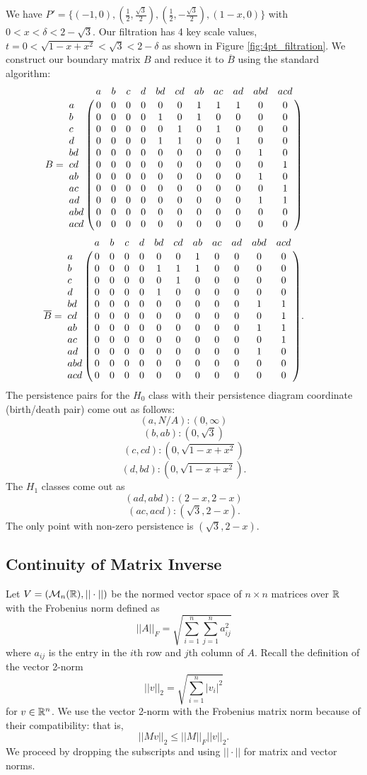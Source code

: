 \documentclass[letterpaper,titlepage]{article}
\begin{document}
We have $P' = \{(-1,0),(\frac{1}{2},\frac{\sqrt{3}}{2}),(\frac{1}{2},-\frac{\sqrt{3}}{2}),(1-x,0)\}$ with $0< x < \delta < 2-\sqrt{3}$.
Our filtration has 4 key scale values, $t = 0<\sqrt{1-x+x^2}< \sqrt{3}< 2-\delta$ as shown in Figure \ref{fig:4pt_filtration}. We construct our boundary matrix $B$ and reduce it to $\overline{B}$ using the standard algorithm:
$$B=\bordermatrix{ 
    &   a & b & c & d & bd & cd & ab & ac & ad & abd & acd\cr
    a & 0 & 0 & 0 & 0 &  0 &  0 &  1 &  1 &  1 &   0 &   0 \cr
    b & 0 & 0 & 0 & 0 &  1 &  0 &  1 &  0 &  0 &   0 &   0\cr
    c & 0 & 0 & 0 & 0 &  0 &  1 &  0 &  1 &  0 &   0 &   0\cr
    d & 0 & 0 & 0 & 0 &  1 &  1 &  0 &  0 &  1 &   0 &   0\cr
   bd & 0 & 0 & 0 & 0 &  0 &  0 &  0 &  0 &  0 &   1 &   0\cr
   cd & 0 & 0 & 0 & 0 &  0 &  0 &  0 &  0 &  0 &   0 &   1\cr
   ab & 0 & 0 & 0 & 0 &  0 &  0 &  0 &  0 &  0 &   1 &   0\cr
   ac & 0 & 0 & 0 & 0 &  0 &  0 &  0 &  0 &  0 &   0 &   1\cr
   ad & 0 & 0 & 0 & 0 &  0 &  0 &  0 &  0 &  0 &   1 &   1\cr
  abd & 0 & 0 & 0 & 0 &  0 &  0 &  0 &  0 &  0 &   0 &   0\cr
  acd & 0 & 0 & 0 & 0 &  0 &  0 &  0 &  0 &  0 &   0 &   0\cr
    } \qquad$$
$$\overline{B}=\bordermatrix{ 
    &   a & b & c & d & bd & cd & ab & ac & ad & abd & acd\cr
    a & 0 & 0 & 0 & 0 &  0 &  0 &  1 &  0 &  0 &   0 &   0 \cr
    b & 0 & 0 & 0 & 0 &  1 &  1 &  1 &  0 &  0 &   0 &   0\cr
    c & 0 & 0 & 0 & 0 &  0 &  1 &  0 &  0 &  0 &   0 &   0\cr
    d & 0 & 0 & 0 & 0 &  1 &  0 &  0 &  0 &  0 &   0 &   0\cr
   bd & 0 & 0 & 0 & 0 &  0 &  0 &  0 &  0 &  0 &   1 &   1\cr
   cd & 0 & 0 & 0 & 0 &  0 &  0 &  0 &  0 &  0 &   0 &   1\cr
   ab & 0 & 0 & 0 & 0 &  0 &  0 &  0 &  0 &  0 &   1 &   1\cr
   ac & 0 & 0 & 0 & 0 &  0 &  0 &  0 &  0 &  0 &   0 &   1\cr
   ad & 0 & 0 & 0 & 0 &  0 &  0 &  0 &  0 &  0 &   1 &   0\cr
  abd & 0 & 0 & 0 & 0 &  0 &  0 &  0 &  0 &  0 &   0 &   0\cr
  acd & 0 & 0 & 0 & 0 &  0 &  0 &  0 &  0 &  0 &   0 &   0\cr
    }. \qquad$$
The persistence pairs for the $H_0$ class with their persistence diagram coordinate (birth/death pair) come out as follows:
$$(a,N/A): (0,\infty)$$
$$(b,ab): (0,\sqrt{3})$$
$$(c, cd): (0,\sqrt{1-x+x^2})$$
$$(d, bd): (0,\sqrt{1-x+x^2}).$$
The $H_1$ classes come out as
$$(ad, abd): (2-x, 2-x)$$
$$(ac, acd): (\sqrt{3}, 2-x).$$
The only point with non-zero persistence is $(\sqrt{3}, 2-x).$


\subsection{Continuity of Matrix Inverse} \label{continuity_of_inverse} %
Let $V=(\mathcal{M}_n(\mathbb{R}), ||\cdot||)$ be the normed vector space of $n\times n$ matrices over $\mathbb{R}$ with the Frobenius norm defined as
$$||A||_F = \sqrt{\sum_{i=1}^n\sum_{j=1}^na_{ij}^2}$$
where $a_{ij}$ is the entry in the $i$th row and $j$th column of $A$. Recall the definition of the vector 2-norm
$$||v||_2 = \sqrt{\sum_{i=1}^n |v_i|^2}$$
for $v \in \mathbb{R}^n$. We use the vector 2-norm with the Frobenius matrix norm because of their compatibility: that is, 
$$||Mv||_2 \leq||M||_F||v||_2.$$
We proceed by dropping the subscripts and using $||\cdot||$ for matrix and vector norms.
\end{document}
